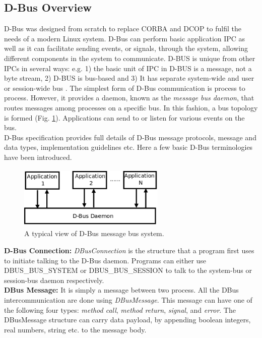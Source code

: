 \documentclass{ifacconf}
\begin{document}
\subsection{D-Bus Overview}
D-Bus was designed from scratch to replace CORBA and DCOP  to fulfil the needs of a modern Linux system. D-Bus can perform basic application IPC as well as it can facilitate sending events, or signals, through the system, allowing different components in the system to communicate. D-BUS is unique from other IPCs in several ways: e.g. 1) the basic unit of IPC in D-BUS is a message, not a byte stream, 2) D-BUS is bus-based and 3) It has separate system-wide and user or session-wide bus \citep{Love2005}. The simplest form of D-Bus communication is process to process. However, it provides a daemon, known as the {\em message bus daemon}, that routes messages among processes on a specific bus. In this fashion, a bus topology is formed (Fig. \ref{fig:dbus-daemon}). Applications can send to or listen for various events on the bus.\\
D-Bus specification \citep{Pennington+2010} provides full details of D-Bus message protocols, message and data types, implementation guidelines etc. Here a few basic D-Bus terminologies have been introduced.\\ 
\begin{figure}
\begin{center}
\includegraphics[width=7cm,height=3.0cm]{./dia-files/dbus-daemon} %
\caption{A typical view of D-Bus message bus system. } 
\label{fig:dbus-daemon}
\end{center}
\end{figure}
\textbf{D-Bus Connection: }
\textit{DBusConnection} is the structure that a program first uses to initiate talking to the D-Bus daemon. Programs can either use DBUS\_BUS\_SYSTEM or DBUS\_BUS\_SESSION to talk to the system-bus or session-bus daemon respectively.\\
\textbf{DBus Message: }
It is simply a message between two process. All the DBus intercommunication are done using \textit{DBusMessage}. This message can have one of the following four types: \textit{method call}, \textit{method return}, \textit{signal}, and \textit{error}. The DBusMessage structure can carry data payload, by appending boolean integers, real numbers, string etc. to the message body.\\ 
\end{document}
